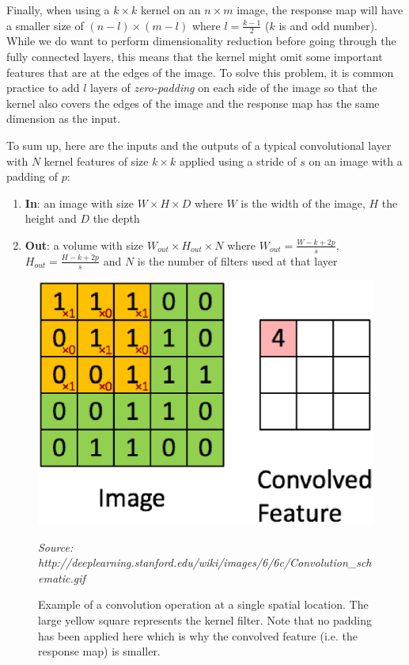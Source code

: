 \documentclass[12pt,twoside]{article}
\newcommand{\source}[1]{\vspace{-3pt} \caption*{ \footnotesize{\textit{Source: {#1}}}} }
\begin{document}
Finally, when using a $k\times k$ kernel on an $n \times m$ image, the response map will have a smaller
size of $(n-l)\times(m-l)$ where $l=\frac{k-1}{2}$ ($k$ is and odd
number). While we do want to perform dimensionality reduction before going
through the fully connected layers, this means that the kernel might omit some
important features that are at the edges of the image. To solve this problem,
it is common practice to add $l$ layers of \textit{zero-padding} on each side of the
image so that the kernel also covers the edges of the image and the response
map has the same dimension as the input.

To sum up, here are the inputs and the outputs of a typical convolutional
layer with $N$ kernel features of size $k \times k$ applied using a stride of
$s$ on an image with a padding of $p$:

\begin{enumerate}
  \item \textbf{In}: an image with size $W \times H \times D$ where $W$ is the
    width of the image, $H$ the height and $D$ the depth
  \item \textbf{Out}: a volume with size $W_{out} \times H_{out} \times N$
    where $W_{out} = \frac{W - k + 2p}{s}$, $H_{out} = \frac{H- k + 2p}{s}$ and
    $N$ is the number of filters used at that layer
\end{enumerate}


\begin{figure}[ht]
  \centering
  \includegraphics[scale=0.5]{./figures/convolution_example.eps}
  \caption{Example of a convolution operation at a single spatial location. The
  large yellow square represents the kernel filter. Note that no padding has been
applied here which is why the convolved feature (i.e. the response map) is
smaller.}
  \source{http://deeplearning.stanford.edu/wiki/images/6/6c/Convolution\_schematic.gif}
  \label{fig:conv_op}
\end{figure}
\end{document}
